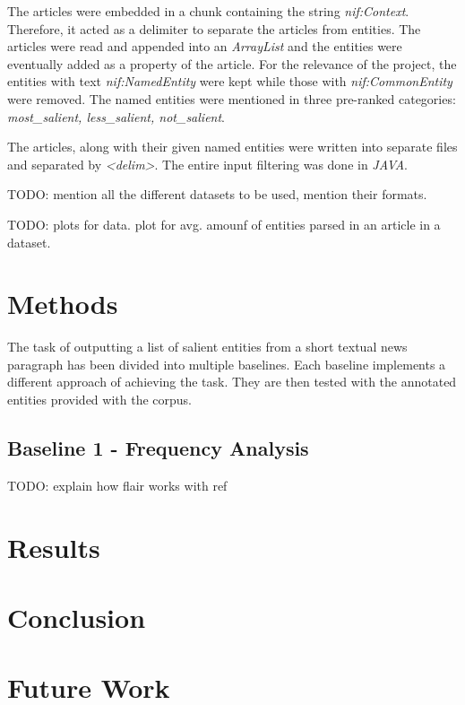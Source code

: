 \documentclass{article}
\begin{document}
			The articles were embedded in a chunk containing the string \textit{nif:Context}. Therefore, it acted as a delimiter to separate the articles from entities. The articles were read and appended into an \textit{ArrayList} and the entities were eventually added as a property of the article. For the relevance of the project, the entities with text \textit{nif:NamedEntity} were kept while those with \textit{nif:CommonEntity} were removed. The named entities were mentioned in three pre-ranked categories: \textit{most\_salient, less\_salient, not\_salient}.
			
			The articles, along with their given named entities were written into separate files and separated by \textit{<delim>}. The entire input filtering was done in \textit{JAVA}. 
			
	
	TODO: mention all the different datasets to be used, mention their formats.
	
	TODO: plots for data. plot for avg. amounf of entities parsed in an article in a dataset.
		
	\section{Methods}
	The task of outputting a list of salient entities from a short textual news paragraph has been divided into multiple baselines. Each baseline implements a different approach of achieving the task. They are then tested with the annotated entities provided with the corpus. 
	
		\subsection{Baseline 1 - Frequency Analysis}
	
		TODO: explain how flair works with ref
	
	
	\section{Results}
	
	\section{Conclusion}
	
	\section{Future Work}
	
	
	 
\end{document}
